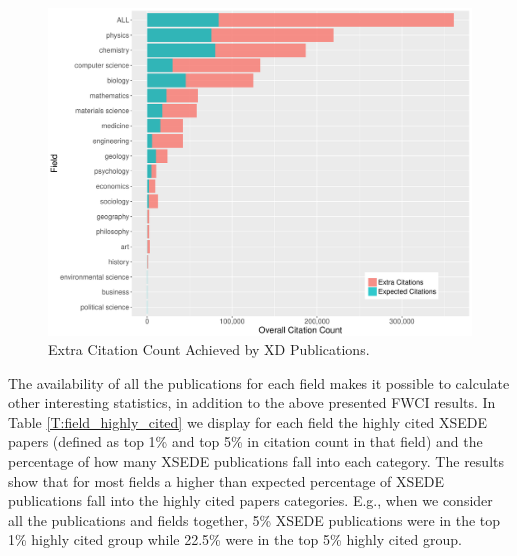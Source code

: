 \documentclass{sig-alternate}
\begin{document}
\begin{figure}[htb!]
    \includegraphics[width=0.95\columnwidth]{images/FWCI_CC.pdf}
    \caption{Extra Citation Count Achieved by XD Publications.}
    \label{F:FWCI_CC}
\end{figure}

The availability of all the publications for each field makes it
possible to calculate other interesting statistics, in addition to the
above presented FWCI results. In Table \ref{T:field_highly_cited} we
display for each field the highly cited XSEDE papers (defined as top
1\% and top 5\% in citation count in that field) and the percentage of
how many XSEDE publications fall into each category. The results show
that for most fields a higher than expected percentage of XSEDE
publications fall into the highly cited papers categories. E.g., when
we consider all the publications and fields together, 5\% XSEDE
publications were in the top 1\% highly cited group while 22.5\% were
in the top 5\% highly cited group.
\end{document}
